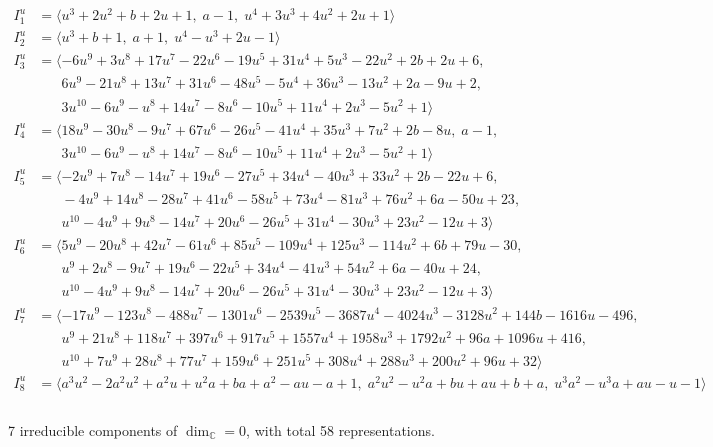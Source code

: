 \documentclass[1p]{elsarticle_modified}
\theoremstyle{definition}
\begin{document}
\begin{align*}
I^u_{1}&=\langle 
u^3+2 u^2+b+2 u+1,\;a-1,\;u^4+3 u^3+4 u^2+2 u+1\rangle \\
I^u_{2}&=\langle 
u^3+b+1,\;a+1,\;u^4- u^3+2 u-1\rangle \\
I^u_{3}&=\langle 
-6 u^9+3 u^8+17 u^7-22 u^6-19 u^5+31 u^4+5 u^3-22 u^2+2 b+2 u+6,\\
\phantom{I^u_{3}}&\phantom{= \langle  }6 u^9-21 u^8+13 u^7+31 u^6-48 u^5-5 u^4+36 u^3-13 u^2+2 a-9 u+2,\\
\phantom{I^u_{3}}&\phantom{= \langle  }3 u^{10}-6 u^9- u^8+14 u^7-8 u^6-10 u^5+11 u^4+2 u^3-5 u^2+1\rangle \\
I^u_{4}&=\langle 
18 u^9-30 u^8-9 u^7+67 u^6-26 u^5-41 u^4+35 u^3+7 u^2+2 b-8 u,\;a-1,\\
\phantom{I^u_{4}}&\phantom{= \langle  }3 u^{10}-6 u^9- u^8+14 u^7-8 u^6-10 u^5+11 u^4+2 u^3-5 u^2+1\rangle \\
I^u_{5}&=\langle 
-2 u^9+7 u^8-14 u^7+19 u^6-27 u^5+34 u^4-40 u^3+33 u^2+2 b-22 u+6,\\
\phantom{I^u_{5}}&\phantom{= \langle  }-4 u^9+14 u^8-28 u^7+41 u^6-58 u^5+73 u^4-81 u^3+76 u^2+6 a-50 u+23,\\
\phantom{I^u_{5}}&\phantom{= \langle  }u^{10}-4 u^9+9 u^8-14 u^7+20 u^6-26 u^5+31 u^4-30 u^3+23 u^2-12 u+3\rangle \\
I^u_{6}&=\langle 
5 u^9-20 u^8+42 u^7-61 u^6+85 u^5-109 u^4+125 u^3-114 u^2+6 b+79 u-30,\\
\phantom{I^u_{6}}&\phantom{= \langle  }u^9+2 u^8-9 u^7+19 u^6-22 u^5+34 u^4-41 u^3+54 u^2+6 a-40 u+24,\\
\phantom{I^u_{6}}&\phantom{= \langle  }u^{10}-4 u^9+9 u^8-14 u^7+20 u^6-26 u^5+31 u^4-30 u^3+23 u^2-12 u+3\rangle \\
I^u_{7}&=\langle 
-17 u^9-123 u^8-488 u^7-1301 u^6-2539 u^5-3687 u^4-4024 u^3-3128 u^2+144 b-1616 u-496,\\
\phantom{I^u_{7}}&\phantom{= \langle  }u^9+21 u^8+118 u^7+397 u^6+917 u^5+1557 u^4+1958 u^3+1792 u^2+96 a+1096 u+416,\\
\phantom{I^u_{7}}&\phantom{= \langle  }u^{10}+7 u^9+28 u^8+77 u^7+159 u^6+251 u^5+308 u^4+288 u^3+200 u^2+96 u+32\rangle \\
I^u_{8}&=\langle 
a^3 u^2-2 a^2 u^2+a^2 u+u^2 a+b a+a^2- a u- a+1,\;a^2 u^2- u^2 a+b u+a u+b+a,\;u^3 a^2- u^3 a+a u- u-1\rangle \\
\\
\end{align*}
\raggedright * 7 irreducible components of $\dim_{\mathbb{C}}=0$, with total 58 representations.\\
\end{document}
